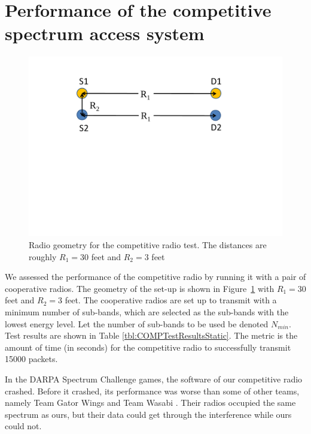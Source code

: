 \section{Performance of the competitive spectrum access system}
\begin{figure}[tpb]
  \begin{center}
    \centerline{\includegraphics[width=160mm]{CompTestNodeAssignment.pdf}}
    \caption{Radio geometry for the competitive radio test. The distances are roughly $R_1 = 30$ feet and $R_2 = 3$ feet}
    \label{fig:CompTestNodeAssignment}
  \end{center}
\end{figure}

We assessed the performance of the competitive radio by running it with a pair of cooperative radios. The geometry of the set-up is shown in Figure~\ref{fig:CompTestNodeAssignment} with $R_1 = 30$ feet and $R_2 = 3$ feet. The cooperative radios are set up to transmit with a minimum number of sub-bands, which are selected as the sub-bands with the lowest energy level. Let the number of sub-bands to be used be denoted $N_{min}$. Test results are shown in Table \ref{tbl:COMPTestResultsStatic}. The metric is the amount of time (in seconds) for the competitive radio to successfully transmit 15000 packets.

In the DARPA Spectrum Challenge games, the software of our competitive radio crashed. Before it crashed, its performance was worse than some of other teams, namely Team Gator Wings and Team Wasabi \cite{DSCFinalEventResults}. Their radios occupied the same spectrum as ours, but their data could get through the interference while ours could not. 


